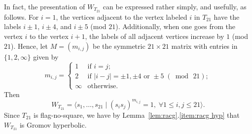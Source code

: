 \documentclass{amsart}
\theoremstyle{plain}
\theoremstyle{definition}
\theoremstyle{remark}
\numberwithin{equation}{section}
\newcommand{\T}{T_{21}}
\begin{document}
In fact, the presentation of $W_{\T}$ can be expressed rather simply, and usefully, as follows. For $i=1$, the vertices adjacent to the vertex labeled $i$ in $\T$ have the labels $i \pm 1$, $i \pm 4$, and $i \pm 5$ (mod $21$). Additionally, when one goes from the vertex $i$ to the vertex $i+1$, the labels of all adjacent vertices increase by $1$ (mod $21$). Hence, let $M = (m_{i,j})$ be the symmetric $21 \times 21$ matrix with entries in $\{ 1, 2, \infty \}$ given by
\begin{equation*}
m_{i,j} =
\begin{cases}
1 & \text{if } i = j;\\
2 & \text{if } |i - j| = \pm 1, \pm 4 \text{ or } \pm 5 \; (\bmod\, 21);\\
\infty & \text{otherwise}.
\end{cases}
\end{equation*}
Then
\begin{equation*}
W_{\T} = \langle s_1, \dotsc, s_{21} \mid (s_i s_j)^{m_{i,j}} = 1, \;\forall 1 \leqslant i,j \leqslant 21 \rangle.
\end{equation*}
Since $\T$ is flag-no-square, we have by Lemma~\ref{lem:racg}.\eqref{item:racg hyp} that $W_{\T}$ is Gromov hyperbolic.
\end{document}
